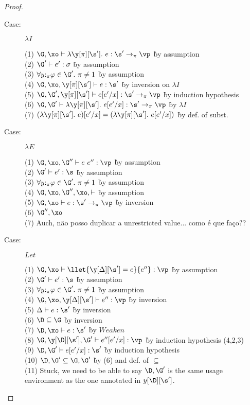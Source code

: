 \begin{proof}
\begin{description}
\item[Case:] $\lambda I$
\begin{tabbing}
  (1) $\G, \xo \vdash \lambda\y[\pi][\s'].~e : \s'\to_\pi\vp$ \` by assumption\\
  (2) $\G' \vdash e' : \sigma$ \` by assumption\\
  (3) $\hasnolinearvars{\G'}$ \` by assumption\\
  (4) $\G, \xo, \y[\pi][\s'] \vdash e : \s'$ \` by inversion on $\lambda I$\\
  (5) $\G, \G', \y[\pi][\s'] \vdash e[e'/x] : \s' \to_\pi \vp$ \` by induction hypothesis\\
  (6) $\G, \G' \vdash \lambda\y[\pi][\s'].~e[e'/x] : \s' \to_\pi\vp$ \` by $\lambda I$\\
  (7) $(\lambda \y[\pi][\s'].~e)[e'/x] = (\lambda \y[\pi][\s'].~e[e'/x])$ \` by def. of subst.\\
\end{tabbing}

\item[Case:] $\lambda E$
\begin{tabbing}
  (1) $\G, \xo, \G'' \vdash e~e'' : \vp$ \` by assumption\\
  (2) $\G' \vdash e' : \s$ \` by assumption \\
  (3) $\hasnolinearvars{\G'}$ \` by assumption\\
  (4) $\G,\xo,\G'',\xo,\vdash$ \` by assumption\\
  (5) $\G, \xo \vdash e : \s'\to_\pi\vp$ \` by inversion \\
  (6) $\G'', \xo $ \` \\
  (7) Auch, não posso duplicar a unrestricted value... como é que faço??
\end{tabbing}

\item[Case:] $Let$
\begin{tabbing}
  (1) $\G, \xo \vdash \llet{\y[\Delta][\s'] = e}{e''} : \vp$ \` by assumption\\
  (2) $\G' \vdash e' : \s$ \` by assumption \\
  (3) $\hasnolinearvars{\G'}$ \` by assumption\\
  (4) $\G,\xo,\y[\Delta][\s'] \vdash e'' : \vp$ \` by inversion\\
  (5) $\Delta \vdash e : \s'$ \` by inversion\\
  (6) $\D \subseteq \G$ \` by inversion\\
  (7) $\D,\xo \vdash e : \s'$ \` by $Weaken$\\
  (8) $\G, \y[\D][\s'], \G' \vdash e''[e'/x] : \vp$ \` by induction hypothesis (4,2,3)\\
  (9) $\D, \G' \vdash e[e'/x] : \s'$ \` by induction hypothesis\\
  (10) $\D,\G' \subseteq \G,\G'$ \` by (6) and def. of $\subseteq$\\
  (11) Stuck, we need to be able to say $\D,\G'$ is the same usage environment as the one annotated in $y[\D][\s']$.
\end{tabbing}


\end{description}
\end{proof}
